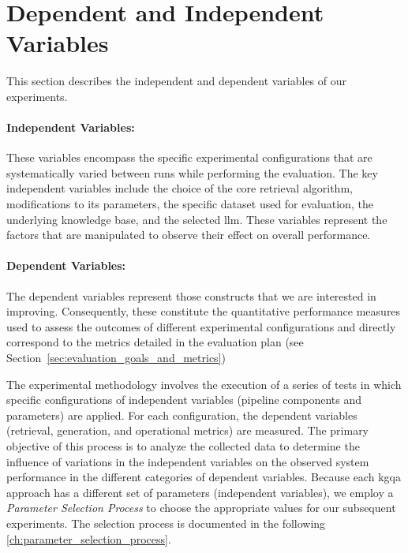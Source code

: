 
\section{Dependent and Independent Variables}
\label{sec:exp_prelim_variables}
This section describes the independent and dependent variables of our experiments.

\paragraph{Independent Variables:} These variables encompass the specific experimental configurations that are systematically varied between runs while performing the evaluation. The key independent variables include the choice of the core retrieval algorithm, modifications to its parameters, the specific dataset used for evaluation, the underlying knowledge base, and the selected \gls{llm}. These variables represent the factors that are manipulated to observe their effect on overall performance.

\paragraph{Dependent Variables:} The dependent variables represent those constructs that we are interested in improving. Consequently, these constitute the quantitative performance measures used to assess the outcomes of different experimental configurations and directly correspond to the metrics detailed in the evaluation plan (see Section~\ref{sec:evaluation_goals_and_metrics})

The experimental methodology involves the execution of a series of tests in which specific configurations of independent variables (pipeline components and parameters) are applied. For each configuration, the dependent variables (retrieval, generation, and operational metrics) are measured. The primary objective of this process is to analyze the collected data to determine the influence of variations in the independent variables on the observed system performance in the different categories of dependent variables. Because each \gls{kgqa} approach has a different set of parameters (independent variables), we employ a \emph{Parameter Selection Process} to choose the appropriate values for our subsequent experiments. The selection process is documented in the following \autoref{ch:parameter_selection_process}.
